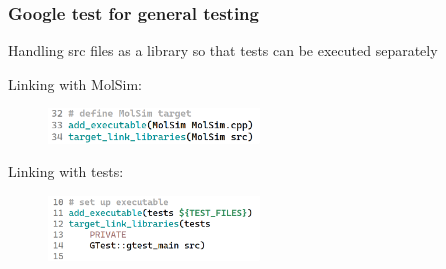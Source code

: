 \begin{frame}
    \frametitle{Google test for general testing}

        Handling src files as a library so that tests can be executed separately

    Linking with MolSim:
    \begin{figure}[H]
        \includegraphics[width=0.5\textwidth]{res/gtest2.png}
    \end{figure}

    Linking with tests:
    \begin{figure}[H]
        \includegraphics[width=0.5\textwidth]{res/gtest4.png}
    \end{figure}

\end{frame}

